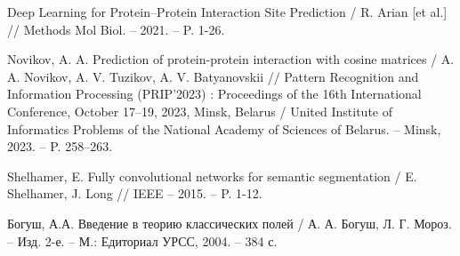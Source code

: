 \newpage
{} %
\renewcommand{\bibsection}{\centering\textbf{\large СПИСОК ИСПОЛЬЗОВАННЫХ ИСТОЧНИКОВ}} %
%

%

\begin{thebibliography}{9}

Deep Learning for Protein–Protein Interaction Site Prediction / R. Arian [et al.] // Methods Mol Biol. – 2021. – P. 1-26.

Novikov, A. A. Prediction of protein-protein interaction with cosine matrices / A. A. Novikov, A. V. Tuzikov, A. V. Batyanovskii // Pattern Recognition and Information Processing (PRIP'2023) : Proceedings of the 16th International Conference, October 17–19, 2023, Minsk, Belarus / United Institute of Informatics Problems of the National Academy of Sciences of Belarus. – Minsk, 2023. – P. 258–263.

Shelhamer, E. Fully convolutional networks for semantic segmentation / E. Shelhamer, J. Long // IEEE – 2015. – P. 1-12.

Богуш, А.А. Введение в теорию классических полей / А. А. Богуш, Л. Г. Мороз. -- Изд. 2-е. -- М.: Едиториал УРСС, 2004. -- 384 с.

\end{thebibliography}